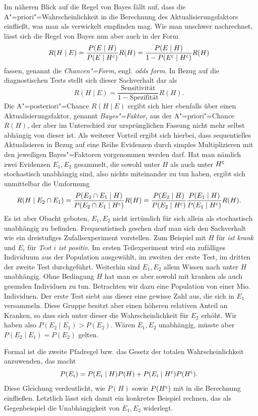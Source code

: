 Im näheren Blick auf die Regel von Bayes fällt auf, dass die
A"=priori"=Wahrscheinlichkeit in die Berechnung des Aktualisierungsfaktors
einfließt, was man als verwickelt empfinden mag. Wie man unschwer
nachrechnet, lässt sich die Regel von Bayes nun aber auch in der Form
\[R(H\mid E) = \frac{P(E\mid H)}{P(E\mid H^\mathsf c)}R(H) = \frac{P(E\mid H)}{1-P(E^\mathsf c\mid H^\mathsf c)}R(H)\]
fassen, genannt die \emph{Chancen"=Form}, engl. \emph{odds form}.
In Bezug auf die diagnostischen Tests stellt sich dieser Sachverhalt dar als
\[R(H\mid E) = \frac{\text{Sensitivität}}{1-\text{Spezifität}}R(H).\]
Die A"=posteriori"=Chance $R(H\mid E)$ ergibt sich hier ebenfalls über
einen Aktualisierungsfaktor, genannt \emph{Bayes"=Faktor}, aus der
A"=priori"=Chance $R(H)$, der aber im Unterschied zur ursprünglichen
Fassung nicht mehr selbst abhängig von dieser ist. Als weiterer
Vorteil ergibt sich hierbei, dass sequentielles Aktualisieren in Bezug
auf eine Reihe Evidenzen durch simples Multiplizieren mit den jeweiligen
Bayes"=Faktoren vorgenommen werden darf. Hat man nämlich zwei
Evidenzen $E_1,E_2$ gesammelt, die sowohl unter $H$ als auch unter $H^\mathsf c$
stochastisch unabhängig sind, also nichts miteinander zu tun haben,
ergibt sich unmittelbar die Umformung
\[R(H\mid E_2\cap E_1) = \frac{P(E_2\cap E_1\mid H)}{P(E_2\cap E_1\mid H^\mathsf c)}R(H)
= \frac{P(E_2\mid H)}{P(E_2\mid H^\mathsf c)}
\frac{P(E_1\mid H)}{P(E_1\mid H^\mathsf c)}R(H).\]
Es ist aber Obacht geboten, $E_1,E_2$ nicht irrtümlich für sich allein
als stochastisch unabhängig zu befinden. Frequentistisch gesehen darf man
sich den Sachverhalt wie ein dreistufiges Zufallsexperiment vorstellen.
Zum Beispiel mit $H$ für \emph{ist krank} und $E_i$ für \emph{Test $i$ ist
positiv}. Im ersten Teilexperiment wird ein zufälliges Individuum aus der
Population ausgewählt, im zweiten der erste Test, im dritten der zweite
Test durchgeführt. Weiterhin sind $E_1,E_2$ allem Wissen nach unter $H$
unabhängig. Ohne Bedingung $H$ hat man es aber sowohl mit kranken
als auch gesunden Individuen zu tun. Betrachten wir dazu eine Population
von einer Mio. Individuen. Der erste Test siebt aus dieser eine gewisse
Zahl aus, die sich in $E_1$ versammeln. Diese Gruppe besitzt aber einen
höheren relativen Anteil an Kranken, so dass sich unter dieser die
Wahrscheinlichkeit für $E_2$ erhöht. Wir haben also $P(E_2\mid E_1) > P(E_2)$.
Wären $E_1,E_2$ unabhängig, müsste aber $P(E_2\mid E_1)=P(E_2)$ gelten.

Formal ist die zweite Pfadregel bzw. das Gesetz der totalen
Wahrscheinlichkeit anzuwenden, das macht
\[P(E_i) = P(E_i\mid H)P(H) + P(E_i\mid H^\mathsf c)P(H^\mathsf c).\]
Diese Gleichung verdeutlicht, wie $P(H)$ sowie $P(H^\mathsf c)$ mit
in die Berechnung einfließen. Letztlich lässt sich damit ein konkretes
Beispiel rechnen, das als Gegenbeispiel die Unabhängigkeit von $E_1,E_2$
widerlegt.

